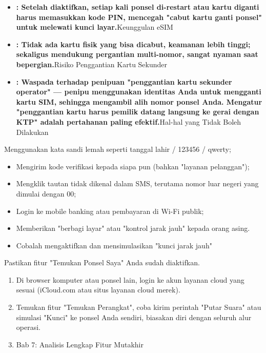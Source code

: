 
\begin{itemize}
  \item \textbf{: Setelah diaktifkan, setiap kali ponsel di-restart atau kartu diganti harus memasukkan kode PIN, mencegah "cabut kartu ganti ponsel" untuk melewati kunci layar.}Keunggulan eSIM
  \item \textbf{: Tidak ada kartu fisik yang bisa dicabut, keamanan lebih tinggi; sekaligus mendukung pergantian multi-nomor, sangat nyaman saat bepergian.}Risiko Penggantian Kartu Sekunder
  \item \textbf{: Waspada terhadap penipuan "penggantian kartu sekunder operator" — penipu menggunakan identitas Anda untuk mengganti kartu SIM, sehingga mengambil alih nomor ponsel Anda. Mengatur "penggantian kartu harus pemilik datang langsung ke gerai dengan KTP" adalah pertahanan paling efektif.}Hal-hal yang Tidak Boleh Dilakukan
\end{itemize}

\begin{tcbwarn}{Menggunakan kata sandi lemah seperti tanggal lahir / 123456 / qwerty;}
\begin{itemize}
  \item Mengirim kode verifikasi kepada siapa pun (bahkan "layanan pelanggan");
  \item Mengklik tautan tidak dikenal dalam SMS, terutama nomor luar negeri yang dimulai dengan 00;
  \item Login ke mobile banking atau pembayaran di Wi-Fi publik;
  \item Memberikan "berbagi layar" atau "kontrol jarak jauh" kepada orang asing.
  \item Cobalah mengaktifkan dan mensimulasikan "kunci jarak jauh"
\end{itemize}

\end{tcbwarn}

\begin{tcbpractice}{Pastikan fitur "Temukan Ponsel Saya" Anda sudah diaktifkan.}
\begin{enumerate}
  \item Di browser komputer atau ponsel lain, login ke akun layanan cloud yang sesuai (iCloud.com atau situs layanan cloud merek).
  \item Temukan fitur "Temukan Perangkat", coba kirim perintah "Putar Suara" atau simulasi "Kunci" ke ponsel Anda sendiri, biasakan diri dengan seluruh alur operasi.
  \item Bab 7: Analisis Lengkap Fitur Mutakhir
\end{enumerate}

\end{tcbpractice}
